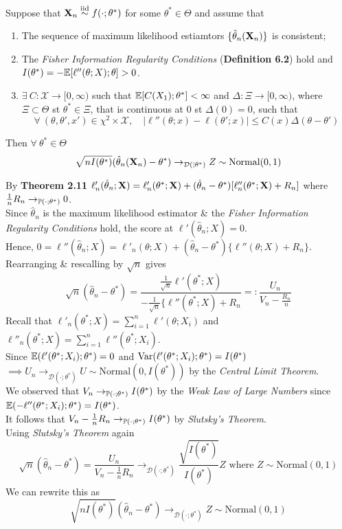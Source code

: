 \documentclass[11pt,a4paper]{article}
\begin{document}
Suppose that $\textbf{X}_n\overset{\text{iid}}{\sim} f(\cdot;\theta^*)$ for some $\theta^*\in\Theta$ and assume that
\begin{enumerate}[label=\roman*)]
	\item The sequence of maximum likelihood estiamtors $\{\hat{\theta}_n(\textbf{X}_n)\}$ is consistent;
	\item The \textit{Fisher Information Regularity Conditions} (\textbf{Definition 6.2}) hold and ${I(\theta^*)=-\mathbb{E}[\ell''(\theta;X);\theta]>0}$.
	\item $\exists\ C:\mathcal{X}\to[0,\infty)$ such that $\mathbb{E}[C(X_1);\theta^*]<\infty$ and $\Delta:\Xi\to[0,\infty)$, where $\Xi\subset\Theta$ st $\theta^*\in\Xi$, that is continuous at 0 st $\Delta(0)=0$, such that 
	$$\forall\ (\theta,\theta',x')\in\chi^2\times\mathcal{X},\quad|\ell''(\theta;x)-\ell(\theta';x)|\leq C(x)\Delta(\theta-\theta')$$
\end{enumerate}
Then $\forall\ \theta^*\in\Theta$
$$\sqrt{nI(\theta^*)}(\hat{\theta}_n(\textbf{X}_n)-\theta^*)\to_{\mathcal{D}(\dot;\theta^*)}Z\sim\text{Normal}(0,1)$$

By \textbf{Theorem 2.11} $\ell'_n(\hat{\theta}_n;\textbf{X})=\ell'_n(\theta^*;\textbf{X})+(\hat{\theta}_n-\theta^*)[\ell''_n(\theta^*;\textbf{X})+R_n]$ where $\frac{1}{n}R_n\to_{\mathbb{P}(\cdot;\theta^*)}0$.\\
Since $\hat{\theta}_n$ is the maximum likelihood estimator \& the \textit{Fisher Information Regularity Conditions} hold, the score at $\ell'(\hat{\theta}_n;X)=0$.\\
Hence, $0=\ell''(\hat{\theta}_n;X)=\ell'_n(\theta;X)+(\hat{\theta}_n-\theta^*)\{\ell''(\theta;X)+R_n\}$.\\
Rearranging \& rescalling by $\sqrt{n}$ gives
$$\sqrt{n}(\hat{\theta}_n-\theta^*)=\frac{\frac{1}{\sqrt{n}}\ell'(\theta^*;X)}{-\frac{1}{\sqrt{n}}\{\ell''(\theta^*;X)+R_n}=:\frac{U_n}{V_n-\frac{R_n}{n}}$$
Recall that $\ell'_n(\theta^*;X)=\sum\limits_{i=1}^n\ell'(\theta;X_i)$ and $\ell''_n(\theta^*;X)=\sum\limits_{i=1}^n\ell''(\theta^*;X_i)$.\\
Since $\mathbb{E}(\ell'(\theta^*;X_i);\theta^*)=0$ and $\mathrm{Var}(\ell'(\theta^*;X_i);\theta^*)=I(\theta^*)$\\$\implies U_n\to_{\mathcal{D}(\cdot;\theta^*)}U\sim\text{Normal}(0,I(\theta^*))$ by the \textit{Central Limit Theorem}.\\
We observed that $V_n\to_{\mathbb{P}(\cdot;\theta^*)}I(\theta^*)$ by the \textit{Weak Law of Large Numbers} since ${\mathbb{E}(-\ell''(\theta^*;X_i);\theta^*)=I(\theta^*)}$.\\
It follows that $V_n-\frac{1}{n}R_n\to_{\mathbb{P}(\cdot;\theta^*)}I(\theta^*)$ by \textit{Slutsky's Theorem}.\\
Using \textit{Slutsky's Theorem} again
$$\sqrt{n}(\hat{\theta}_n-\theta^*)=\frac{U_n}{V_n-\frac{1}{n}R_n}\to_{\mathcal{D}(\cdot;\theta^*)}\frac{\sqrt{I(\theta^*)}}{I(\theta^*)}Z\text{ where }Z\sim\text{Normal}(0,1)$$
We can rewrite this as
$$\sqrt{nI(\theta^*)}(\hat{\theta}_n-\theta^*)\to_{\mathcal{D}(\cdot;\theta^*)}Z\sim\text{Normal}(0,1)$$
\end{document}
